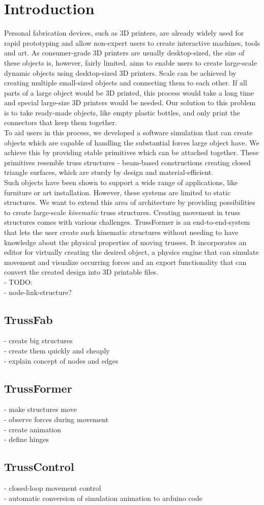 \chapter{Introduction}\label{ch:introduction}
Personal fabrication devices, such as 3D printers, are already widely used for rapid prototyping and allow non-expert users to create interactive machines, tools and art. As consumer-grade 3D printers are usually desktop-sized, the size of these objects is, however, fairly limited. \trussFabName{} aims to enable users to create large-scale dynamic objects using desktop-sized 3D printers. Scale can be achieved by creating multiple small-sized objects and connecting them to each other. If all parts of a large object would be 3D printed, this process would take a long time and special large-size 3D printers would be needed. Our solution to this problem is to take ready-made objects, like empty plastic bottles, and only print the connectors that keep them together.\\
To aid users in this process, we developed a software simulation that can create objects which are capable of handling the substantial forces large object have. We achieve this by providing stable primitives which can be attached together. These primitives resemble truss structures - beam-based constructions creating closed triangle surfaces, which are sturdy by design and material-efficient.\\
Such objects have been shown to support a wide range of applications, like furniture or art installation. However, these systems are limited to static structures. We want to extend this area of architecture by providing possibilities to create large-scale \textit{kinematic} truss structures. Creating movement in truss structures comes with various challenges. TrussFormer is an end-to-end-system that lets the user create such kinematic structures without needing to have knowledge about the physical properties of moving trusses. It incorporates an editor for virtually creating the desired object, a physics engine that can simulate movement and visualize occurring forces and an export functionality that can convert the created design into 3D printable files.\\
- TODO:\\
- node-link-structure?\\
\section{TrussFab}
- create big structures\\
- create them quickly and cheaply\\
- explain concept of nodes and edges\\
\section{TrussFormer}
- make structures move\\
- observe forces during movement\\
- create animation\\
- define hinges\\
\section{TrussControl}
- closed-loop movement control\\
- automatic conversion of simulation animation to arduino code\\
